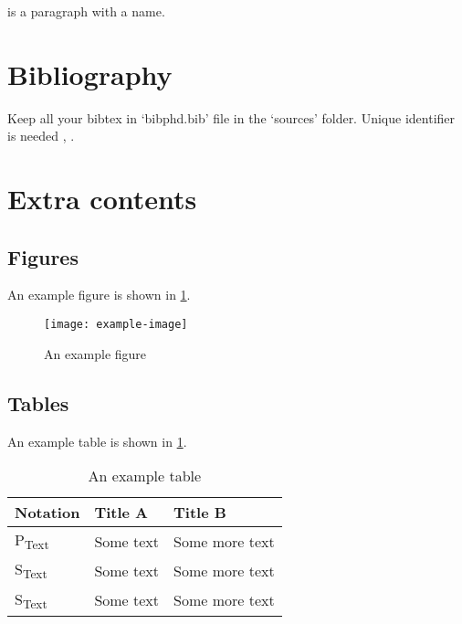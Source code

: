  is a paragraph with a name.

\section{Bibliography}
Keep all your bibtex in `bibphd.bib' file in the `sources' folder. Unique identifier is needed \eg, \cite{grant2014cvx}.
\section{Extra contents}
\subsection{Figures}
An example figure is shown in \ref{\CHID_fig:exmple_image}.
\begin{figure}[t]
	\centering
	\texttt{[image: example-image]}
	\caption{An example figure}\label{\CHID_fig:exmple_image}
\end{figure}

\subsection{Tables}
An example table is shown in \ref{\CHID_tb:exmple_table}.
\begin{table}[!t]
	\caption{An example table}
	\label{\CHID_tb:exmple_table}
	\centering
	\begin{tabular}{|l|l|l|}
		\hline\hline
		Notation & Title A & Title B \\
		\hline\hline
		P\textsubscript{Text} & Some text & Some more text  \\ \hline
		S\textsubscript{Text}  & Some text & Some more text \\ \hline
		S\textsubscript{Text}  & Some text & Some more text\\ 
		\hline\hline
	\end{tabular}
	\vspace{5pt}
\end{table}


